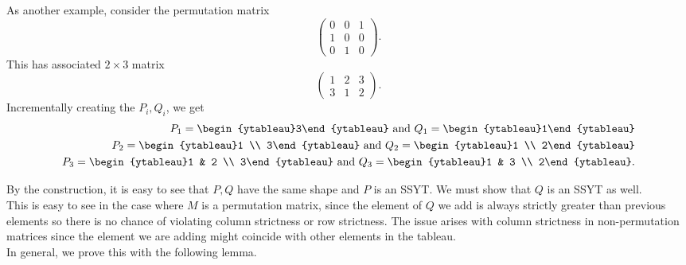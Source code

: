 	\begin{fex}
		As another example, consider the permutation matrix
		\[
		\begin{pmatrix}
			0 & 0 & 1 \\
			1 & 0 & 0 \\
			0 & 1 & 0
		\end{pmatrix}.
		\]
		This has associated $2 \times 3$ matrix
		\[
		\begin{pmatrix}
			1 & 2 & 3 \\ 3 & 1 & 2
		\end{pmatrix}.
		\]
		Incrementally creating the $P_i,Q_i$, we get
		\begin{align*}
			P_1 = \begin{ytableau}3\end{ytableau} \text{ and } Q_1 = \begin{ytableau}1\end{ytableau} \\
			P_2 = \begin{ytableau}1 \\ 3\end{ytableau} \text{ and } Q_2 = \begin{ytableau}1 \\ 2\end{ytableau} \\
			P_3 = \begin{ytableau}1 & 2 \\ 3\end{ytableau} \text{ and } Q_3 = \begin{ytableau}1 & 3 \\ 2\end{ytableau}.
		\end{align*}
	\end{fex}

	By the construction, it is easy to see that $P,Q$ have the same shape and $P$ is an SSYT. We must show that $Q$ is an SSYT as well.\\
	This is easy to see in the case where $M$ is a permutation matrix, since the element of $Q$ we add is always strictly greater than previous elements so there is no chance of violating column strictness or row strictness. The issue arises with column strictness in non-permutation matrices since the element we are adding might coincide with other elements in the tableau.\\
	In general, we prove this with the following lemma.

